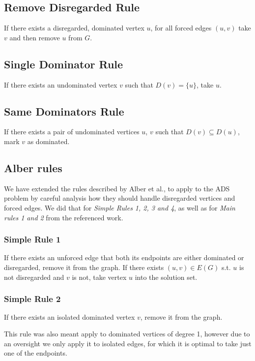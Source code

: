 \documentclass[a4paper,UKenglish,cleveref, autoref, thm-restate]{lipics-v2021}
\begin{document}
\subsection{Remove Disregarded Rule}
If there exists a disregarded, dominated vertex $u$, for all forced edges $(u, v)$ take $v$ and then remove $u$ from $G$. 

\subsection{Single Dominator Rule}
\label{rule:singledominator}
If there exists an undominated vertex $v$ such that $D(v) = \{u\}$, take $u$.

\subsection{Same Dominators Rule}
\label{rule:samedominators}

If there exists a pair of undominated vertices $u$, $v$ such that $D(v) \subseteq D(u)$, mark $v$ as dominated.

\subsection{Alber rules}

We have extended the rules described by Alber et al.\cite{DBLP:journals/anor/AlberBN06}, to apply to the ADS problem by careful analysis how
they should handle disregarded vertices and forced edges. We did that for \emph{Simple Rules 1, 2, 3 and 4}, as well as for \emph{Main rules 1 and 2} from the referenced work.
\subsubsection{Simple Rule 1}
If there exists an unforced edge that both its endpoints are either dominated or disregarded, remove it from the graph.
If there exists $(u, v) \in E(G)$ s.t. $u$ is not disregarded and $v$ is not, take vertex $u$ into the solution set.


\subsubsection{Simple Rule 2}
If there exists an isolated dominated vertex $v$, remove it from the graph.

This rule was also meant apply to dominated vertices of degree 1, however due to an oversight we only apply it to isolated edges, for which it is optimal to take just one of the endpoints.
\end{document}
